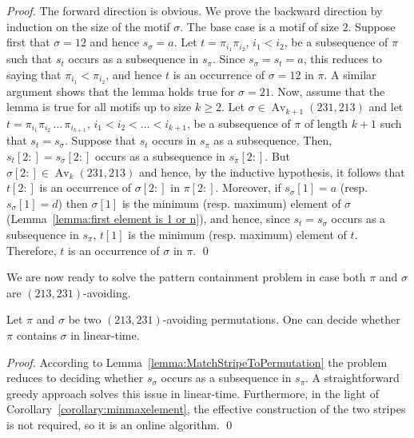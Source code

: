\documentclass[a4paper]{llncs}
\DeclareMathOperator{\AV}{Av}
\DeclareMathOperator{\Avd}{Av}
\newcommand\Av[2]{\Avd_{{#1}}({#2})}
\begin{document}
\begin{proof}
  The forward direction is obvious.
  We prove the backward direction by induction on the size of the motif
  $\sigma$.
  The base case is a motif of size $2$.
  Suppose first that $\sigma = 12$ and hence $s_\sigma = a$.
  Let $t = \pi_{i_1}\pi_{i_2}$, $i_1 < i_2$, be a subsequence of $\pi$
  such that $s_t$ occurs as a subsequence in $s_\pi$.
  Since $s_\sigma = s_t = a$, this reduces to saying that
  $\pi_{i_1} < \pi_{i_2}$, and hence $t$ is an occurrence of $\sigma = 12$ in $\pi$.
  A similar argument shows that the lemma holds true for $\sigma = 21$.
  Now, assume that the lemma is true for all motifs up to size $k \geq 2$.
  Let $\sigma \in \Av{k+1}{231,213}$ and
  let $t = \pi_{i_1}\pi_{i_2}\,\ldots\,\pi_{i_{k+1}}$,
  $i_1 < i_2 < \ldots < i_{k+1}$,
  be a subsequence of $\pi$ of length $k+1$ such that
  $s_t = s_\sigma$.
  Suppose that $s_t$ occurs in $s_\pi$ as a subsequence.
  Then, $s_t[2:] = s_\sigma[2:]$ occurs as a subsequence in $s_\pi[2:]$.
  But $\sigma[2:] \in \Av{k}{231,213}$ and hence,
  by the inductive hypothesis, it follows that
  $t[2:]$ is an occurrence of $\sigma[2:]$ in $\pi[2:]$.
  Moreover, if $s_\sigma[1] = a$ (resp. $s_\sigma[1] = d$)
  then $\sigma[1]$ is the minimum (resp. maximum) element of $\sigma$
  (Lemma~\ref{lemma:first element is 1 or n}),
  and hence, since $s_t = s_\sigma$ occurs as a subsequence in $s_\pi$,
  $t[1]$ is the minimum (resp. maximum) element of $t$.
  Therefore, $t$ is an occurrence of $\sigma$ in $\pi$.
\qed
\end{proof}

We are now ready to solve the pattern containment problem in case
both $\pi$ and $\sigma$ are $(213, 231)$-avoiding.

\begin{proposition}
	Let $\pi$ and $\sigma$ be two $(213,231)$-avoiding permutations.
	One can decide whether $\pi$ contains $\sigma$ in linear-time.
\end{proposition}

\begin{proof}
According to Lemma~\ref{lemma:MatchStripeToPermutation} the problem reduces
to deciding whether $s_\sigma$ occurs as a subsequence in $s_\pi$.
A straightforward greedy approach solves this issue in linear-time.
Furthermore, in the light of Corollary~\ref{corollary:minmaxelement},
the effective construction of the two stripes is not required,
so it is an online algorithm.
\qed
\end{proof}
\end{document}
